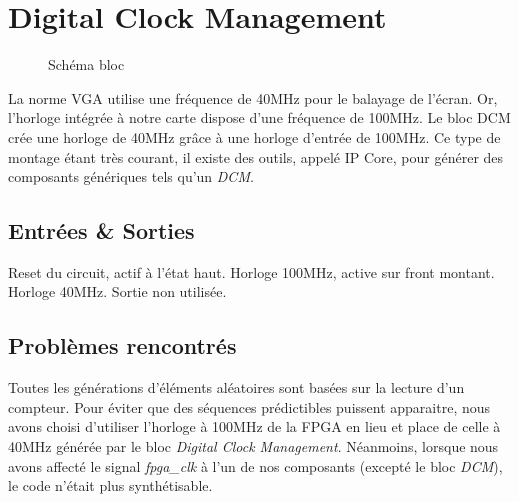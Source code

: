 \documentclass[french]{nakrule}
\begin{document}
\clearpage

\section{Digital Clock Management}
\label{sec:dcm}

\begin{figure}
\caption{Schéma bloc}
\label{dcmBloc}
\end{figure}

La norme VGA utilise une fréquence de 40MHz pour le balayage de l’écran. Or,
l’horloge intégrée à notre carte dispose d’une fréquence de 100MHz. Le bloc DCM
crée une horloge de 40MHz grâce à une horloge d'entrée de 100MHz.
Ce type de montage étant très courant, il existe des outils, appelé IP Core,
pour générer des composants génériques tels qu'un \emph{DCM}. 
\vspace{.4in}

\subsection{Entrées \& Sorties}
\label{subsec:Entrees_Sorties_dmc}

\begin{descr}
   Reset du circuit, actif à l'état haut.
   Horloge 100MHz, active sur front montant.
   Horloge 40MHz.
   Sortie non utilisée.
\end{descr}


\subsection{Problèmes rencontrés}
\label{subsec:Problemes_rencontres_dcm}

Toutes les générations d'éléments aléatoires sont basées sur la lecture d’un
compteur. Pour éviter que des séquences prédictibles puissent apparaitre, nous
avons choisi d'utiliser l'horloge à 100MHz de la FPGA en lieu et place de celle
à 40MHz générée par le bloc \emph{Digital Clock Management}. Néanmoins, lorsque
nous avons affecté le signal \emph{fpga\_clk} à l'un de nos composants (excepté
le bloc \emph{DCM}), le code n'était plus synthétisable.
\end{document}
